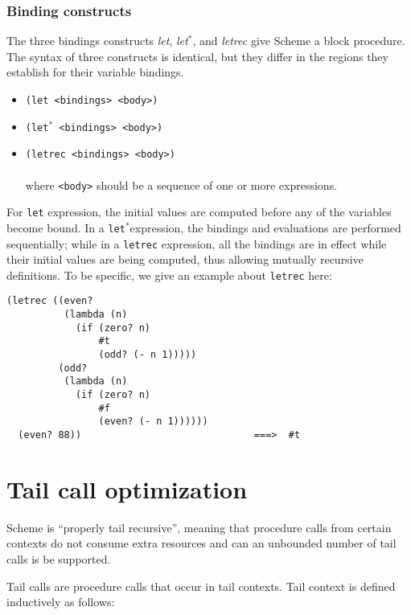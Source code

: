 \documentclass{article}
\begin{document}
\subsubsection*{Binding constructs}
The three bindings constructs \textit{let}, \textit{let$^*$}, and \textit{letrec} give Scheme a block procedure. The syntax of three constructs is identical, but they differ in the regions they establish for their variable bindings.
\begin{itemize}
\item \texttt{(let <bindings> <body>)}
\item \texttt{(let$^*$ <bindings> <body>)}
\item \texttt{(letrec <bindings> <body>)}\\ \\
where \texttt{<body>} should be a sequence of one or more expressions.
\end{itemize}
For \texttt{let} expression, the initial values are computed before any of the variables become bound. In a \texttt{let$^*$}expression, the bindings and evaluations are performed sequentially; while in a \texttt{letrec} expression, all the bindings are in effect while their initial values are being computed, thus allowing mutually recursive definitions.
To be specific, we give an example about \texttt{letrec} here:
\begin{lstlisting}
(letrec ((even?
          (lambda (n)
            (if (zero? n)
                #t
                (odd? (- n 1)))))
         (odd?
          (lambda (n)
            (if (zero? n)
                #f
                (even? (- n 1))))))
  (even? 88))                              ===>  #t
\end{lstlisting}

\section{Tail call optimization}
Scheme is ``properly tail recursive'', meaning that procedure calls from certain contexts do not consume extra resources and can an unbounded number of tail calls is be supported.

Tail calls are procedure calls that occur in tail contexts. Tail context is defined inductively as follows:
\end{document}
